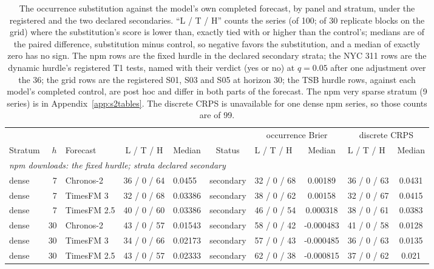 \begin{table}[p]
\centering\scriptsize\setlength{\tabcolsep}{1.2pt}
\renewcommand{\arraystretch}{0.92}\setlength{\abovecaptionskip}{0pt}
\caption{The occurrence substitution against the model's own completed forecast, by panel and stratum,
under the registered \qs{} and the two declared secondaries. ``L / T / H'' counts the series (of 100; of 30
replicate blocks on the grid) where the substitution's score is lower than, exactly tied with or higher than
the control's; medians are of the paired difference, substitution minus control, so negative favors the
substitution, and a median of exactly zero has no sign. The npm rows are the fixed hurdle in the declared
secondary strata; the NYC 311 rows are the dynamic hurdle's registered T1 tests, named with their verdict (yes or no) at
$q = 0.05$ after one adjustment over the 36; the grid rows are the registered S01, S03 and S05 at horizon 30;
the TSB hurdle rows, against each model's completed control, are post hoc and differ in both parts of the
forecast. The npm very sparse stratum (9 series) is in Appendix~\ref{app:s2tables}. The discrete CRPS is
unavailable for one dense npm series, so those counts are of 99.}
\label{tab:occ}
\begin{tabular}{lrlclclclc}
\toprule
 & & & \multicolumn{3}{c}{\qs{}} & \multicolumn{2}{c}{occurrence Brier} & \multicolumn{2}{c}{discrete CRPS} \\
\cmidrule(lr){4-6} \cmidrule(lr){7-8} \cmidrule(lr){9-10}
Stratum & $h$ & Forecast & L / T / H & Median & Status & L / T / H & Median & L / T / H & Median \\
\midrule
\multicolumn{10}{l}{\emph{npm downloads: the fixed hurdle; strata declared secondary}} \\
dense & 7 & Chronos-2 & 36 / 0 / 64 & 0.0455 & secondary & 32 / 0 / 68 & 0.00189 & 36 / 0 / 63 & 0.0431 \\
dense & 7 & TimesFM 3 & 32 / 0 / 68 & 0.03386 & secondary & 38 / 0 / 62 & 0.00158 & 32 / 0 / 67 & 0.0415 \\
dense & 7 & TimesFM 2.5 & 40 / 0 / 60 & 0.03386 & secondary & 46 / 0 / 54 & 0.000318 & 38 / 0 / 61 & 0.0383 \\
dense & 30 & Chronos-2 & 43 / 0 / 57 & 0.01543 & secondary & 58 / 0 / 42 & -0.000483 & 41 / 0 / 58 & 0.0128 \\
dense & 30 & TimesFM 3 & 34 / 0 / 66 & 0.02173 & secondary & 57 / 0 / 43 & -0.000485 & 36 / 0 / 63 & 0.0135 \\
dense & 30 & TimesFM 2.5 & 43 / 0 / 57 & 0.02333 & secondary & 62 / 0 / 38 & -0.000815 & 37 / 0 / 62 & 0.021 \\

\end{tabular}
\end{table}
